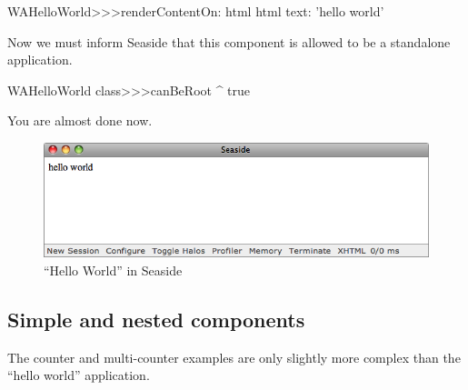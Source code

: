 \documentclass[a4paper,10pt,twoside]{book}
\begin{document}
\begin{code}{}
WAHelloWorld>>>renderContentOn: html
	html text: 'hello world'
\end{code}

Now we must inform Seaside that this component is allowed to be a standalone application.


\begin{code}{}
WAHelloWorld class>>>canBeRoot
	^ true
\end{code}

You are almost done now.


\begin{figure}[ht]
\begin{center}
\includegraphics[width=\textwidth]{WAHelloWorld}
\caption{``Hello World'' in Seaside}
\label{fig:WAHelloWorld}
\end{center}
\end{figure}

\subsection{Simple and nested components}

The counter and multi-counter examples are only slightly more complex than the ``hello world'' application.
\end{document}
